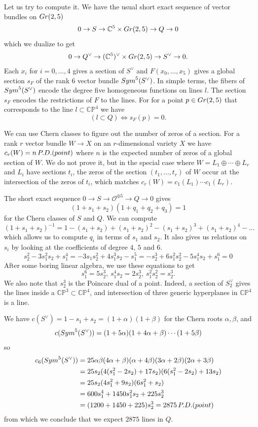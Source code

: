 \documentclass[11pt]{article}
\numberwithin{equation}{section}
\numberwithin{footnote}{section}
\newcommand{\Gr}{{\rm Gr}}
\renewcommand{\P}{{\mathbb P}}
\newcommand{\C}{{\mathbb C}}
\begin{document}
Let us try to compute it. We have the usual short exact sequence of vector bundles on $\Gr(2,5)$
$$
0 \to S \to \C^5\times \Gr(2,5) \to Q \to 0
$$
which we dualize to get 
$$
0 \to Q^\vee \to (\C^5)^\vee \times \Gr(2,5) \to S^\vee \to 0.
$$
Each $x_i$ for $i=0,\ldots, 4$ gives a section of $S^\vee$ and $F(x_0,\ldots, x_5)$ gives a global section $s_F$
of the rank $6$ vector bundle ${\rm Sym}^5 (S^\vee)$. In simple terms, the fibers of  ${\rm Sym}^5 (S^\vee)$ encode the degree five homogeneous functions on lines $l$. The section $s_F$ encodes the restrictions of $F$ to the lines. For for a point $p\in \Gr(2,5)$ that corresponds to the line $l\subset \C\P^4$ we have
$$
(l\subset Q) \iff s_F(p) =0.
$$

\smallskip
We can use Chern classes to figure out the number of zeros of a section. For a rank $r$ vector bundle $W\to X$ on an $r$-dimensional variety $X$ we have $c_r(W)= n\,{\rm P.D.(point)}$ where $n$ is the expected number of zeros of a global section of $W$. We do not prove it, but in the special case where $W = L_1\oplus \cdots\oplus L_r$ and $L_i$ have sections $t_i$, the zeros of the section $(t_1,\ldots, t_r)$ of $W$ occur at the intersection of the zeros of $t_i$, which matches $c_r(W) = c_1(L_1)\cdots c_1(L_r)$.

\smallskip
The short exact sequence $0\to S\to \mathcal O^{\oplus 5} \to Q\to 0$ gives
$$
(1+s_1+s_2)(1+q_1+q_2+q_3)=1
$$
for the Chern classes of $S$ and $Q$. We can compute
$$
(1+s_1+s_2)^{-1} = 1- (s_1+s_2) + (s_1+s_2)^2 - (s_1+s_2)^3 + (s_1+s_2)^4  - \ldots
$$
which allows us to compute $q_i$ in terms of $s_1$ and $s_2$. It also gives us relations on $s_i$ by looking at the coefficients of degree $4$, $5$ and $6$.
$$
s_2^2 - 3s_1^2 s_2 + s_1^4 =-3s_1s_2^2 + 4s_1^3 s_2 - s_1^5= -s_2^3 + 6s_1^2 s_2^2 - 5s_1^4 s_2 +s_1^6=0
$$
After some boring linear algebra, we use these equations to get 
$$s_1^6 = 5s_2^3, ~
s_1^4 s_2 =2s_2^3,~s_1^2s_2^2 = s_2^3.
$$
We also note that $s_2^3$ is the Poincare dual of a point. Indeed, a section of $S_2^\vee$ gives the lines inside a $\C\P^3\subset \C\P^4$, and intersection of three generic hyperplanes in $\C\P^4$ is a line.

\smallskip
We have $c(S^\vee) = 1- s_1 +s_2 = (1+\alpha)(1+\beta)$ for the Chern roots $\alpha,\beta$, and 
$$
c({\rm Sym}^5 (S^\vee)) = (1+5\alpha)(1+4\alpha + \beta)\cdots(1+5\beta)
$$
so 
\begin{align*}
c_6({\rm Sym}^5 (S^\vee)) &= 25\alpha\beta(4\alpha + \beta)(\alpha + 4\beta)(3\alpha + 2\beta)(2\alpha + 3\beta)
\\
&=25 s_2(4(s_1^2-2s_2) + 17s_2)(6(s_1^2-2s_2) + 13s_2)
\\
&=
25 s_2(4s_1^2 + 9s_2)(6s_1^2 + s_2)
\\& = 600 s_1^4 + 1450 s_1^2 s_2 + 225 s_2^3 
\\&
= (1200 + 1450 + 225)s_2^3 = 2875\,{\rm P.D.(point)}
\end{align*}
from which we conclude that we expect $2875$ lines in $Q$. 
\end{document}
